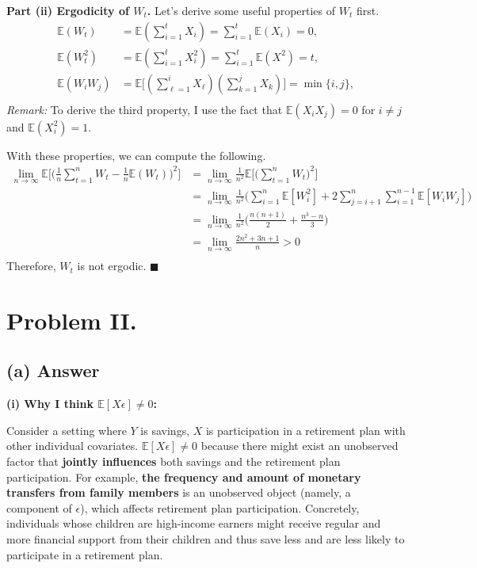 \documentclass[11pt]{article}
\theoremstyle{definition}
\theoremstyle{boldtitle} %
\numberwithin{equation}{section}
\numberwithin{figure}{section}
\numberwithin{table}{section}
\begin{document}
\vspace{5mm}
\noindent \textbf{Part (ii) Ergodicity of $W_t$.}
Let's derive some useful properties of $W_t$ first.
\begin{align}
\mathbb{E}(W_t) & = \mathbb{E}\left(\sum_{i=1}^t X_i \right) = \sum_{i=1}^t \mathbb{E}(X_i) = 0, \\
\mathbb{E}(W_t^2) & = \mathbb{E}\left(\sum_{i=1}^t X_i^2 \right) = \sum_{i=1}^t \mathbb{E}(X^2) = t, \\
\mathbb{E}(W_i W_j) & = \mathbb{E}\bigg[\left(\sum_{\ell=1}^i X_\ell  \right) \left(\sum_{k=1}^j X_k  \right) \bigg] = \min \{ i, j \}, \\
\end{align}
\noindent \textit{Remark:} To derive the third property, I use the fact that $\mathbb{E}(X_i X_j) = 0$ for $i \neq j$ 
and $\mathbb{E}(X_i^2) = 1$.

\noindent With these properties, we can compute the following.
\begin{align*}
  \lim_{n \rightarrow \infty} \mathbb{E} \bigg[\bigg(\frac{1}{n} \sum_{t=1}^{n} W_t - \frac{1}{n} \mathbb{E}(W_t) \bigg)^2 \bigg] 
  & =  \lim_{n \rightarrow \infty}  \frac{1}{n^2} \mathbb{E} \bigg[\bigg(\sum_{t=1}^{n} W_t \bigg)^2 \bigg] \\
  & = \lim_{n \rightarrow \infty}  \frac{1}{n^2}  \bigg(\sum_{i=1}^{n} \mathbb{E} [W_i^2] + 2 \sum_{j=i+1}^n \sum_{i=1}^{n-1} \mathbb{E}[W_i W_j] \bigg) \\
  & =  \lim_{n \rightarrow \infty} \frac{1}{n^2}  \bigg(\frac{n(n+1)}{2} + \frac{n^3 - n}{3} \bigg) \\
  & =  \lim_{n \rightarrow \infty} \frac{2n^2 + 3n + 1}{n}  > 0 \\
\end{align*}
\noindent Therefore, $W_t$ is not ergodic. \(\blacksquare\)

\section*{Problem II.}
\subsection{(a) Answer}
\textbf{(i) Why I think $\mathbb{E}[X\epsilon]\neq 0$:}

Consider a setting where $Y$ is savings, $X$ is participation in a retirement plan with 
other individual covariates.
$\mathbb{E}[X\epsilon] \neq 0$ because there might exist an unobserved factor that \textbf{jointly influences}
both savings and the retirement plan participation.
For example, \textbf{the frequency and amount of monetary transfers from family members} is an unobserved object 
(namely, a component of $\epsilon$), which affects retirement plan participation.
Concretely, individuals whose children are high-income earners might 
receive regular and more financial support from their children and thus save less and are less likely to participate in a retirement plan.
\end{document}
